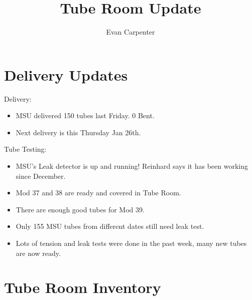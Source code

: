 \documentclass{beamer}
\title{Tube Room Update}
\author{Evan Carpenter}
\begin{document}
\titlepage
\section{Delivery Updates}
	\begin{frame}
		\begin{block}{Delivery:}
			\begin{itemize}
				\item \small MSU delivered 150 tubes last Friday. 0 Bent. 
				\item Next delivery is this Thursday Jan 26th.
			\end{itemize}
		\end{block}	
		\begin{block}{Tube Testing:}
			\begin{itemize}
				\item MSU's Leak detector is up and running! Reinhard says it has been working since December. 
				\item Mod 37 and 38 are ready and covered in Tube Room. 
				\item There are enough good tubes for Mod 39.
				\item Only 155 MSU tubes from different dates still need leak test. 
				\item Lots of tension and leak tests were done in the past week, many new tubes are now ready. 
			\end{itemize}
		\end{block}
	\end{frame}


\section{Tube Room Inventory}
\end{document}
